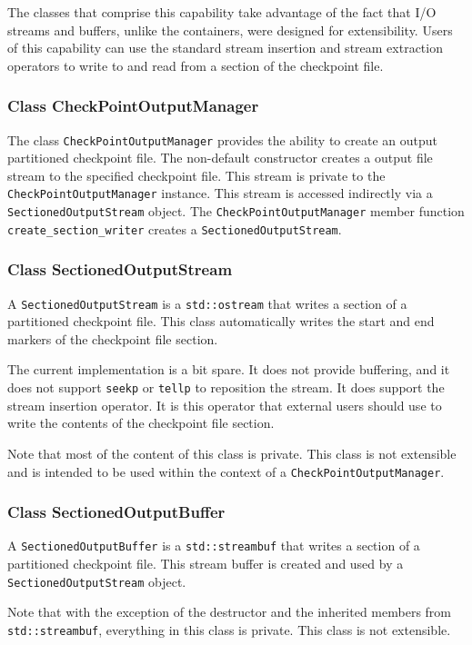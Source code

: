 The classes that comprise this capability take advantage of
the fact that \Cplusplus I/O streams and buffers,
unlike the \Cplusplus containers, were designed for extensibility.
Users of this capability can use the standard \Cplusplus stream insertion
and stream extraction operators to write to and read from a section
of the checkpoint file.
 

\subsubsection{Class CheckPointOutputManager}
The class \verb|CheckPointOutputManager| provides the ability to create
an output partitioned checkpoint file.
The non-default constructor creates a \Cplusplus output file stream to the
specified checkpoint file.
This stream is private to the \verb|CheckPointOutputManager| instance.
This stream is accessed indirectly via a \verb|SectionedOutputStream|
object.
The \verb|CheckPointOutputManager| member function \verb|create_section_writer|
creates a \verb|SectionedOutputStream|.

\subsubsection{Class SectionedOutputStream}
A \verb|SectionedOutputStream| is a \verb|std::ostream| that writes a section
of a partitioned checkpoint file. This class automatically writes the
start and end markers of the checkpoint file section.

The current implementation is a bit spare.
It does not provide buffering,
and it does not support \verb|seekp| or \verb|tellp|
to reposition the stream.
It does support the stream insertion operator.
It is this operator that external users should use to
write the contents of the checkpoint file section.

Note that most of the content of this class is private.
This class is not extensible and is intended to be used within the
context of a \verb|CheckPointOutputManager|.

\subsubsection{Class SectionedOutputBuffer}
A \verb|SectionedOutputBuffer| is a \verb|std::streambuf| that writes a section
of a partitioned checkpoint file. This stream buffer is created and used
by a \verb|SectionedOutputStream| object.

Note that with the exception of the destructor and the inherited members
from \verb|std::streambuf|, everything in this class is private.
This class is not extensible.

